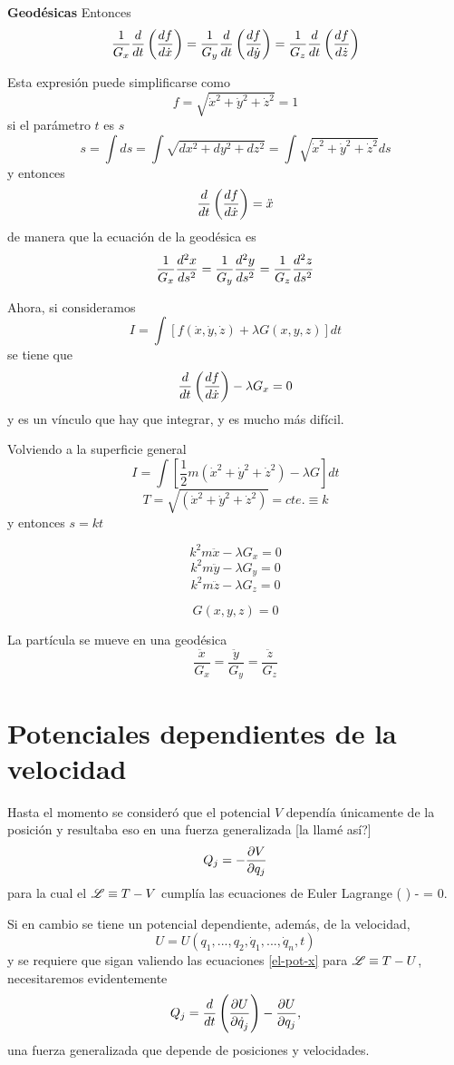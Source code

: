 \documentclass[10pt,oneside]{CBFT_book}
\begin{document}
\begin{ejemplo}{\bf Geodésicas}
Entonces
\[
	\frac{1}{G_x} \dtot{}{t}\left( \dtot{f}{\dot{x}} \right) = 
	\frac{1}{G_y} \dtot{}{t}\left( \dtot{f}{\dot{y}} \right) = 
	\frac{1}{G_z} \dtot{}{t}\left( \dtot{f}{\dot{z}} \right) 
\]

Esta expresión puede simplificarse como 
\[
	f = \sqrt{ \dot{x}^2 + \dot{y}^2 + \dot{z}^2 } = 1
\]
si el parámetro $t$ es $s$
\[
	s = \int ds = \int \sqrt{dx^2 + dy^2 + dz^2 } =
	\int \sqrt{ \dot{x}^2 + \dot{y}^2 + \dot{z}^2 } ds
\]
y entonces
\[
	\dtot{}{t}\left( \dtot{f}{\dot{x}} \right) = \ddot{x}
\]
de manera que la ecuación de la geodésica es
\[
	\frac{1}{G_x}\dtot[2]{x}{s} = \frac{1}{G_y}\dtot[2]{y}{s} = 
	\frac{1}{G_z}\dtot[2]{z}{s}
\]

Ahora, si consideramos
\[
	I = \int [f(\dot{x}, \dot{y}, \dot{z}) + \lambda G(x,y,z)] dt
\]
se tiene que 
\[
	\dtot{}{t}\left( \dtot{f}{\dot{x}}\right) - \lambda G_x = 0
\]
y es un vínculo que hay que integrar, y es mucho más difícil.

Volviendo a la superficie general
\[
	I = \int \left[\frac{1}{2} m (\dot{x}^2 + \dot{y}^2 +
	   \dot{z}^2 ) - \lambda G \right] dt
\]
\[
	T = \sqrt{(\dot{x}^2 + \dot{y}^2 + \dot{z}^2)} = cte. \equiv k
\]
y entonces $s=kt$

\[
	k^2 m \ddot{x} - \lambda G_x = 0
\]
\[
	k^2 m \ddot{y} - \lambda G_y = 0
\]
\[
	k^2 m \ddot{z} - \lambda G_z = 0
\]

\[	
	G(x,y,z) = 0
\]

La partícula se mueve en una geodésica 
\[
	\frac{\ddot{x}}{G_x} = \frac{\ddot{y}}{G_y} = \frac{\ddot{z}}{G_z}
\]
\end{ejemplo}


\section{Potenciales dependientes de la velocidad}

Hasta el momento se consideró que el potencial $V$ dependía únicamente de la posición y resultaba eso en
una fuerza generalizada [la llamé así?]
\[
	Q_j = -\dpar{V}{q_j}
\]
para la cual el $\Lag\equiv T-V$ cumplía las ecuaciones de Euler Lagrange
\be
	 \left(  \right) -  = 0.
	\label{el-pot-x}
\ee

Si en cambio se tiene un potencial dependiente, además, de la velocidad,
\[
	U = U(q_1, ..., q_2,\dot{q}_1,...,\dot{q}_n,t ) 
\]
y se requiere que sigan valiendo las ecuaciones \eqref{el-pot-x} para $\Lag \equiv T-U$, necesitaremos evidentemente
\[
	Q_j = \dtot{}{t} \left( \dpar{U}{\dot{q}_j} \right)  -\dpar{U}{q_j},
\]
una fuerza generalizada que depende de posiciones y velocidades.
\end{document}
